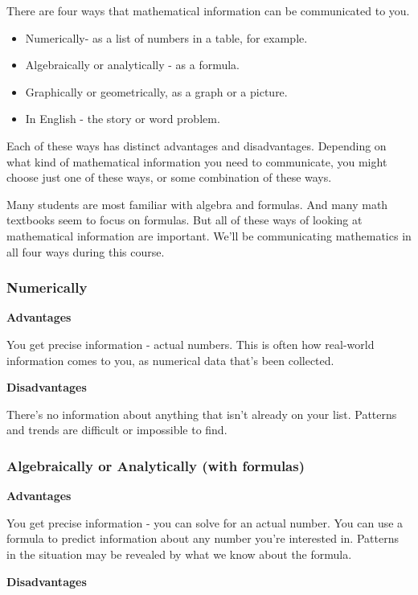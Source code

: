 There are four ways that mathematical information can be communicated to
you.

\begin{itemize}
\item
  Numerically- as a list of numbers in a table, for example.
\item
  Algebraically or analytically - as a formula.
\item
  Graphically or geometrically, as a graph or a picture.
\item
  In English - the story or word problem.
\end{itemize}

Each of these ways has distinct advantages and disadvantages. Depending
on what kind of mathematical information you need to communicate, you
might choose just one of these ways, or some combination of these ways.

Many students are most familiar with algebra and formulas. And many math
textbooks seem to focus on formulas. But all of these ways of looking at
mathematical information are important. We'll be communicating
mathematics in all four ways during this course.

\subsubsection{Numerically }\label{numerically}

\textbf{Advantages }

You get precise information - actual numbers. This is often how
real-world information comes to you, as numerical data that's been
collected.

\textbf{Disadvantages}

There's no information about anything that isn't already on your list.
Patterns and trends are difficult or impossible to find.

\subsubsection{Algebraically or Analytically (with formulas)
}\label{algebraically-or-analytically-with-formulas}

\textbf{Advantages }

You get precise information - you can solve for an actual number. You
can use a formula to predict information about any number you're
interested in. Patterns in the situation may be revealed by what we know
about the formula.

\textbf{Disadvantages}

